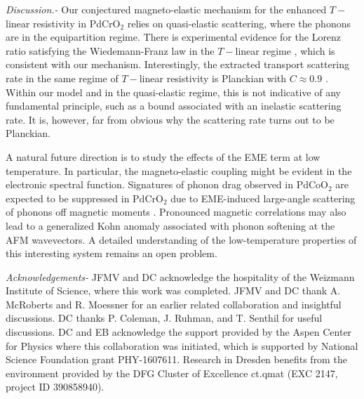 \documentclass[aps,prl,twocolumn,superscriptaddress,amsmath,nofootinbib,10pt,floatfix]{revtex4-2}
\begin{document}
{\it Discussion.-} Our conjectured magneto-elastic mechanism for  the enhanced $T-$linear resistivity in PdCrO$_2$ relies on quasi-elastic scattering, where the phonons are in the equipartition regime. There is experimental evidence for the Lorenz ratio satisfying the Wiedemann-Franz law in the $T-$linear regime \cite{Zhakina2023}, which is consistent with our mechanism. Interestingly, the extracted transport scattering rate in the same regime of $T-$linear resistivity is Planckian with $C\approx 0.9$ \cite{Zhakina2023}. Within our model and in the quasi-elastic regime, this is not indicative of any fundamental principle, such as a bound associated with an inelastic scattering rate. It is, however, far from obvious why the scattering rate turns out to be Planckian. 

A natural future direction is to study the effects of the EME term at low temperature.  In particular, the magneto-elastic coupling might be evident in the electronic spectral function. Signatures of phonon drag observed in PdCoO$_2$ \cite{Hicks_mobility_2012} are expected to be suppressed in PdCrO$_2$ due to EME-induced large-angle scattering of phonons off magnetic moments \cite{takatsu_critical_2009}. Pronounced magnetic correlations may also lead to a generalized Kohn anomaly \cite{Kohn_anomaly} associated with phonon softening at the AFM wavevectors. A detailed understanding of the low-temperature properties of this interesting system remains an open problem.

{\it Acknowledgements-} JFMV and DC acknowledge the hospitality of the Weizmann Institute of Science, where this work was completed. JFMV and DC thank A. McRoberts and R. Moessner for an earlier related collaboration \cite{mcroberts2022intermediatescale} and insightful discussions. DC thanks P. Coleman, J. Ruhman, and T. Senthil for useful discussions. DC and EB acknowledge the support provided by the Aspen Center for Physics where this collaboration was initiated, which is supported by National Science Foundation grant PHY-1607611. Research in Dresden benefits from the environment provided by the DFG Cluster of Excellence ct.qmat (EXC 2147, project ID 390858940).



\end{document}
